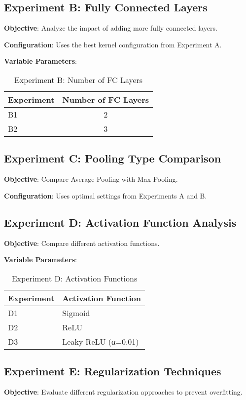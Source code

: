 \documentclass[12pt,a4paper]{article}
\begin{document}
\subsection{Experiment B: Fully Connected Layers}
\textbf{Objective}: Analyze the impact of adding more fully connected layers.

\textbf{Configuration}: Uses the best kernel configuration from Experiment A.

\textbf{Variable Parameters}:
\begin{table}[H]
\centering
\caption{Experiment B: Number of FC Layers}
\begin{tabular}{lc}
\toprule
\textbf{Experiment} & \textbf{Number of FC Layers} \\
\midrule
B1 & 2 \\
B2 & 3 \\
\bottomrule
\end{tabular}
\end{table}

\subsection{Experiment C: Pooling Type Comparison}
\textbf{Objective}: Compare Average Pooling with Max Pooling.

\textbf{Configuration}: Uses optimal settings from Experiments A and B.

\subsection{Experiment D: Activation Function Analysis}
\textbf{Objective}: Compare different activation functions.

\textbf{Variable Parameters}:
\begin{table}[H]
\centering
\caption{Experiment D: Activation Functions}
\begin{tabular}{ll}
\toprule
\textbf{Experiment} & \textbf{Activation Function} \\
\midrule
D1 & Sigmoid \\
D2 & ReLU \\
D3 & Leaky ReLU (α=0.01) \\
\bottomrule
\end{tabular}
\end{table}

\subsection{Experiment E: Regularization Techniques}
\textbf{Objective}: Evaluate different regularization approaches to prevent overfitting.
\end{document}
